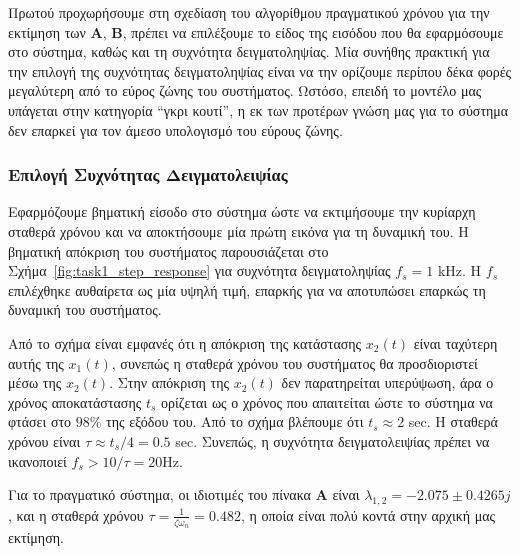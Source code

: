 \documentclass[a4paper,12pt]{article}
\begin{document}
Πρωτού προχωρήσουμε στη σχεδίαση του αλγορίθμου πραγματικού χρόνου για την εκτίμηση των 
$\mathbf{A}, \, \mathbf{B}$, πρέπει να επιλέξουμε το είδος της εισόδου που θα εφαρμόσουμε 
στο σύστημα, καθώς και τη συχνότητα δειγματοληψίας. Μία συνήθης πρακτική για την επιλογή της 
συχνότητας δειγματοληψίας είναι να την ορίζουμε περίπου δέκα φορές μεγαλύτερη από το εύρος 
ζώνης του συστήματος. Ωστόσο, επειδή το μοντέλο μας υπάγεται στην κατηγορία ``γκρι κουτί'', 
η εκ των προτέρων γνώση μας για το σύστημα δεν επαρκεί για τον άμεσο υπολογισμό του εύρους ζώνης.

\subsubsection*{Επιλογή Συχνότητας Δειγματολειψίας}

Εφαρμόζουμε βηματική είσοδο στο σύστημα ώστε να εκτιμήσουμε την κυρίαρχη σταθερά χρόνου  
και να αποκτήσουμε μία πρώτη εικόνα για τη δυναμική του. Η βηματική απόκριση του συστήματος  
παρουσιάζεται στο Σχήμα~\ref{fig:task1_step_response} για συχνότητα δειγματοληψίας $f_s = 1$
kHz. Η $f_s$ επιλέχθηκε αυθαίρετα ως μία υψηλή τιμή, 
επαρκής για να αποτυπώσει επαρκώς τη δυναμική του συστήματος.

Από το σχήμα είναι εμφανές ότι η απόκριση της κατάστασης $x_2(t)$ είναι ταχύτερη αυτής της $x_1(t)$,
συνεπώς η σταθερά χρόνου του συστήματος θα προσδιοριστεί μέσω της $x_2(t)$. Στην απόκριση της
$x_2(t)$ δεν παρατηρείται υπερύψωση, άρα ο χρόνος αποκατάστασης $t_s$ ορίζεται ως ο χρόνος που απαιτείται
ώστε το σύστημα να φτάσει στο $98\%$ της εξόδου του. Από το σχήμα βλέπουμε ότι $t_s \approx 2$
sec. Η σταθερά χρόνου είναι $\tau \approx t_s / 4 = 0.5$
sec. Συνεπώς, η συχνότητα δειγματολειψίας πρέπει να 
ικανοποιεί $f_s > 10 / \tau = 20$Hz.

Για το πραγματικό σύστημα, οι ιδιοτιμές του πίνακα $\mathbf{A}$ είναι $\lambda_{1,2} = -2.075 \pm 0.4265j$, 
και η σταθερά χρόνου $\tau = \frac{1}{\zeta \omega_n} = 0.482$, η οποία είναι πολύ κοντά στην αρχική 
μας εκτίμηση.
\end{document}
